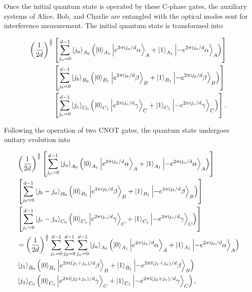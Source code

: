 \documentclass[aps,twocolumn,superscriptaddress,showpacs,nofootinbib]{revtex4-2}
\renewcommand{\i}{\mathrm{i}}
\begin{document}
\begin{widetext}
Once the initial quantum state is operated by these C-phase gates, the auxiliary systems of Alice, Bob, and Charlie are entangled with the optical modes sent for interference measurement. The initial quantum state is transformed into









\begin{equation}\label{eq:pes}
\begin{split}
\left( \frac{1}{2d} \right)^{\frac{3}{2}}&\left[ \sum_{j_a = 0}^{d-1} \ket{j_a}_{A_0} \left( \ket{0}_{A_1}
\ket{e^{2\pi \i  j_a /d}\alpha}_A + \ket{1}_{A_1}\ket{-e^{2\pi \i  j_a /d}\alpha}_A \right) \right] \\
& \left[ \sum_{j_b = 0}^{d-1} \ket{j_b}_{B_0} \left( \ket{0}_{B_1}\ket{e^{2\pi \i  j_b /d}\beta}_B + \ket{1}_{B_1}\ket{-e^{2\pi \i  j_b /d}\beta}_B \right) \right]\\
&\left[ \sum_{j_c = 0}^{d-1} \ket{j_c}_{C_0} \left( \ket{0}_{C_1}\ket{e^{2\pi \i  j_c /d}\gamma}_C + \ket{1}_{C_1}\ket{-e^{2\pi \i  j_c /d}\gamma}_C \right) \right].
\end{split}
\end{equation}

Following the operation of two CNOT gates, the quantum state undergoes unitary evolution into

\begin{equation}
\begin{split}
&
\left( \frac{1}{2d} \right)^{\frac{3}{2}}
\left[ \sum_{j_a = 0}^{d-1} \ket{j_a}_{A_0}
\left( \ket{0}_{A_1}\ket{e^{2\pi \i  j_a /d} \alpha }_A + \ket{1}_{A_1}\ket{-e^{2\pi \i  j_a /d}\alpha}_A \right) \right] \\
&
\left[ \sum_{j_b = 0}^{d-1} \ket{j_b - j_a}_{B_0} \left( \ket{0}_{B_1}\ket{e^{2\pi \i  j_b /d} \beta }_B + \ket{1}_{B_1}\ket{-e^{2\pi \i  j_b /d}\beta}_B \right) \right] \\
&
\left[ \sum_{j_c = 0}^{d-1} \ket{j_c - j_a}_{C_0} \left( \ket{0}_{C_1}\ket{e^{2\pi \i  j_c /d} \gamma }_C + \ket{1}_{C_1}\ket{-e^{2\pi \i  j_c /d}\gamma}_C \right) \right] \\
&
= \left( \frac{1}{2d} \right)^{\frac{3}{2}} \sum_{j_1 = 0}^{d-1} \sum_{j_2 = 0}^{d-1} \sum_{j_a = 0}^{d-1}
\ket{j_a}_{A_0}
\left( \ket{0}_{A_1}\ket{e^{2\pi \i  j_a /d}\alpha}_A + \ket{1}_{A_1}\ket{-e^{2\pi \i  j_a /d}\alpha}_A \right) \\
&
\ket{j_1}_{B_0}\left( \ket{0}_{B_1}\ket{e^{2\pi \i  (j_1+j_a) /d}\beta}_B + \ket{1}_{B_1}\ket{-e^{2\pi \i  (j_1+j_a) /d}\beta}_B \right)\\
&
\ket{j_2}_{C_0}\left( \ket{0}_{C_1}\ket{e^{2\pi \i  (j_2+j_a) /d}\gamma}_C + \ket{1}_{C_1}\ket{-e^{2\pi \i  (j_2+j_a) /d}\gamma}_C \right),
\end{split}
\end{equation}


\end{widetext}
\end{document}
